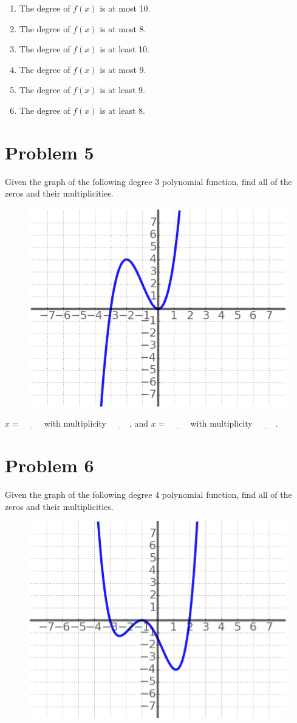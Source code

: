 \documentclass[12pt]{article}
\begin{document}
\begin{enumerate}[label=\Alph*)]
    \item The degree of $f(x)$ is at most 10.
    \item The degree of $f(x)$ is at most 8.
    \item The degree of $f(x)$ is at least 10.
    \item The degree of $f(x)$ is at most 9.
    \item The degree of $f(x)$ is at least 9.
    \item The degree of $f(x)$ is at least 8.
\end{enumerate}

\section*{Problem 5}
Given the graph of the following degree 3 polynomial function, find all of the zeros and their multiplicities.

\begin{figure}[!ht]
    \centering
    \includegraphics[width=0.5\linewidth]{1.png}
\end{figure}

$x = \underline{\hspace{1cm}}$ with multiplicity $\underline{\hspace{1cm}}$, and $x = \underline{\hspace{1cm}}$ with multiplicity $\underline{\hspace{1cm}}$.

\section*{Problem 6}
Given the graph of the following degree 4 polynomial function, find all of the zeros and their multiplicities.

\begin{figure}[!ht]
    \centering
    \includegraphics[width=0.5\linewidth]{2.png}
\end{figure}
\end{document}
